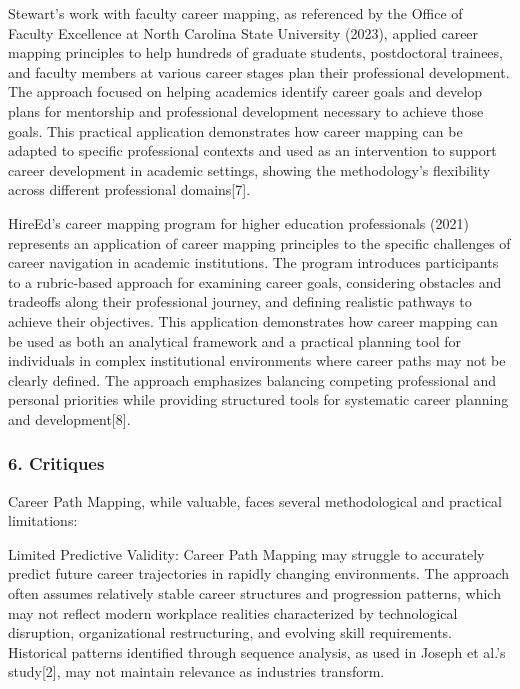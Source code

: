 \documentclass[./main.tex]{subfiles}
\begin{document}
Stewart's work with faculty career mapping, as referenced by the Office
of Faculty Excellence at North Carolina State University (2023), applied
career mapping principles to help hundreds of graduate students,
postdoctoral trainees, and faculty members at various career stages plan
their professional development. The approach focused on helping
academics identify career goals and develop plans for mentorship and
professional development necessary to achieve those goals. This
practical application demonstrates how career mapping can be adapted to
specific professional contexts and used as an intervention to support
career development in academic settings, showing the methodology's
flexibility across different professional domains{[}7{]}.

HireEd's career mapping program for higher education professionals
(2021) represents an application of career mapping principles to the
specific challenges of career navigation in academic institutions. The
program introduces participants to a rubric-based approach for examining
career goals, considering obstacles and tradeoffs along their
professional journey, and defining realistic pathways to achieve their
objectives. This application demonstrates how career mapping can be used
as both an analytical framework and a practical planning tool for
individuals in complex institutional environments where career paths may
not be clearly defined. The approach emphasizes balancing competing
professional and personal priorities while providing structured tools
for systematic career planning and development{[}8{]}.

\subsubsection{6. Critiques}\label{critiques}

Career Path Mapping, while valuable, faces several methodological and
practical limitations:

Limited Predictive Validity: Career Path Mapping may struggle to
accurately predict future career trajectories in rapidly changing
environments. The approach often assumes relatively stable career
structures and progression patterns, which may not reflect modern
workplace realities characterized by technological disruption,
organizational restructuring, and evolving skill requirements.
Historical patterns identified through sequence analysis, as used in
Joseph et al.'s study{[}2{]}, may not maintain relevance as industries
transform.
\end{document}
